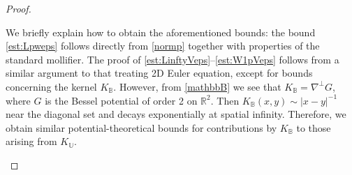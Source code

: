 \documentclass[11pt,reqno]{amsproc}
\newcommand{\la}{\label}
\newcommand{\be}{\begin{equation}}
\newcommand{\ee}{\end{equation}}
\newcommand{\R}{\mathbb{R}}
\newcommand{\B}{\mathbb{B}}
\newcommand{\U}{\mathbb{U}}
\begin{document}
\begin{proof}
\begin{enumerate}
\begin{enumerate}
    \end{enumerate}
    We briefly explain how to obtain the aforementioned bounds: the bound \eqref{est:Lpweps} follows directly from \eqref{normp} together with properties of the standard mollifier. The proof of \eqref{est:LinftyVeps}--\eqref{est:W1pVeps} follows from a similar argument to that treating 2D Euler equation, except for bounds concerning the kernel $K_\B$. However, from \eqref{mathbbB} we see that $K_\B = \nabla^\perp G$, where $G$ is the Bessel potential of order 2 on $\R^2$. Then $K_\B(x,y) \sim |x-y|^{-1}$ near the diagonal set and decays exponentially at spatial infinity. Therefore, we obtain similar potential-theoretical bounds for contributions by $K_\B$ to those arising from $K_\U$. 
    

\end{enumerate}
\end{proof}
\end{document}
